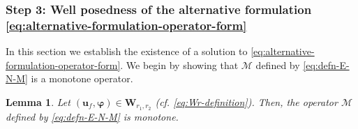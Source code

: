 \documentclass[11pt]{article}
\numberwithin{equation}{section}
\newcommand{\bvarphi}{{\boldsymbol\varphi}}
\newcommand{\bu}{\mathbf{u}}
\newcommand{\0}{{\mathbf{0}}}
\def\bW{\mathbf{W}}
\newcommand{\cM}{\mathcal{M}}
\newtheorem{lem}[thm]{Lemma}
\numberwithin{equation}{section}
\begin{document}
\subsubsection[]{Step 3: Well posedness of the alternative formulation \eqref{eq:alternative-formulation-operator-form}} \label{sec:wellposedness-alternative-formulation}

In this section we establish the existence of a solution to \eqref{eq:alternative-formulation-operator-form}.
We begin by showing that $\cM$ defined by \eqref{eq:defn-E-N-M} is a monotone operator.

\begin{lem}\label{lem:M-monotone-operator}
Let $(\bu_f,\bvarphi)\in \bW_{r_1,r_2}$ (cf. \eqref{eq:Wr-definition}). Then, the operator $\cM$ defined by \eqref{eq:defn-E-N-M} is monotone.
\end{lem}
%
\end{document}
